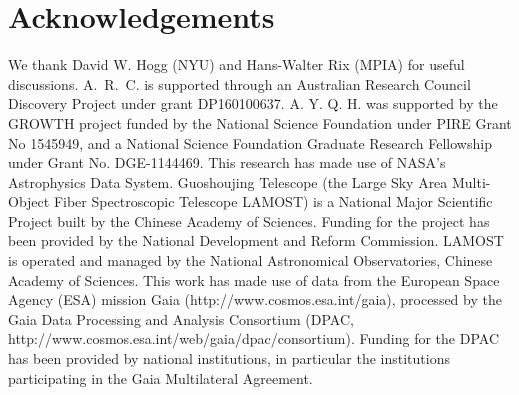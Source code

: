 \documentclass[a4paper,fleqn,usenatbib]{mnras}
\begin{document}
\section*{Acknowledgements}
We thank David W. Hogg (NYU) and Hans-Walter Rix (MPIA) for useful discussions. 
A.~R.~C. is supported through an Australian Research Council Discovery Project under grant DP160100637.
A. Y. Q. H. was supported by the GROWTH project funded by the National Science Foundation under PIRE Grant No 1545949, and a National Science Foundation Graduate Research Fellowship under Grant No. DGE-1144469. 
This research has made use of NASA's Astrophysics Data System.
Guoshoujing Telescope (the Large Sky Area Multi-Object Fiber Spectroscopic Telescope LAMOST) is a National Major Scientific Project built by the Chinese Academy of Sciences. Funding for the project has been provided by the National Development and Reform Commission. LAMOST is operated and managed by the National Astronomical Observatories, Chinese Academy of Sciences. 
This work has made use of data from the European Space Agency (ESA) mission Gaia (http://www.cosmos.esa.int/gaia), processed by the Gaia Data Processing and Analysis Consortium (DPAC, http://www.cosmos.esa.int/web/gaia/dpac/consortium). Funding for the DPAC has been provided by national institutions, in particular the institutions participating in the Gaia Multilateral Agreement.


 

\end{document}
